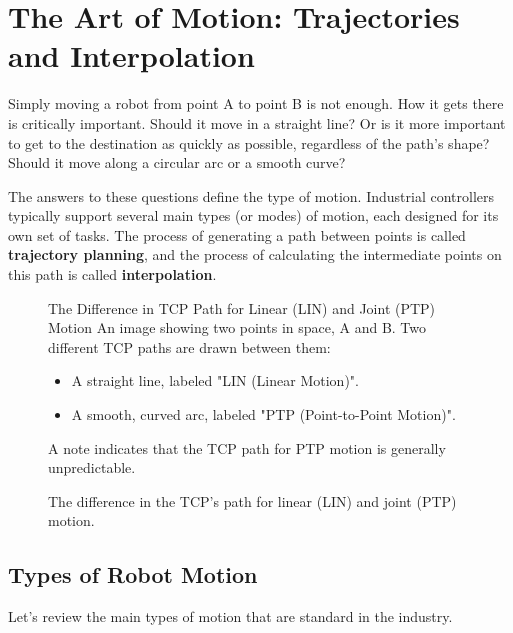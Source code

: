 \section{The Art of Motion: Trajectories and Interpolation}
\label{sec:art_of_motion}

Simply moving a robot from point A to point B is not enough. How it gets there is critically important. Should it move in a straight line? Or is it more important to get to the destination as quickly as possible, regardless of the path's shape? Should it move along a circular arc or a smooth curve?

The answers to these questions define the type of motion. Industrial controllers typically support several main types (or modes) of motion, each designed for its own set of tasks. The process of generating a path between points is called \textbf{trajectory planning}, and the process of calculating the intermediate points on this path is called \textbf{interpolation}.

\begin{figure}[h!]
    \centering
    \begin{infobox}{The Difference in TCP Path for Linear (LIN) and Joint (PTP) Motion}
        An image showing two points in space, A and B. Two different TCP paths are drawn between them:
        \begin{itemize}
            \item A straight line, labeled "LIN (Linear Motion)".
            \item A smooth, curved arc, labeled "PTP (Point-to-Point Motion)".
        \end{itemize}
        A note indicates that the TCP path for PTP motion is generally unpredictable.
    \end{infobox}
    \caption{The difference in the TCP's path for linear (LIN) and joint (PTP) motion.}
    \label{fig:ptp_vs_lin}
\end{figure}

\subsection{Types of Robot Motion}
Let's review the main types of motion that are standard in the industry.

